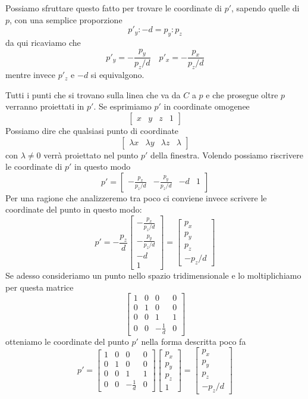 Possiamo sfruttare questo fatto per trovare le coordinate di $p'$, sapendo quelle di $p$, con una semplice proporzione
\[ p'_y : -d = p_y : p_z \]
da qui ricaviamo che
\[ p'_y = -\frac{p_y}{p_z / d} \quad p'_x = -\frac{p_x}{p_z / d} \]
mentre invece $p'_z$ e $-d$ si equivalgono.

Tutti i punti che si trovano sulla linea che va da $C$ a $p$ e che prosegue oltre $p$ verranno proiettati in $p'$.
Se esprimiamo $p'$ in coordinate omogenee
\[
	\begin{bmatrix}
		x & y & z & 1
	\end{bmatrix}
\]
Possiamo dire che qualsiasi punto di coordinate
\[
	\begin{bmatrix}
		\lambda x & \lambda y & \lambda z & \lambda
	\end{bmatrix}
\]
con $\lambda \neq 0$ verr\`a proiettato nel punto $p'$ della finestra. Volendo possiamo riscrivere le coordinate di $p'$
in questo modo
\[
	p' = \begin{bmatrix}
		-\displaystyle\frac{p_x}{p_z / d} &
		-\displaystyle\frac{p_y}{p_z / d} &
		-d                                &
		1
	\end{bmatrix}
\]
Per una ragione che analizzeremo tra poco ci conviene invece scrivere le coordinate del punto in questo modo:
\[
	p' = -\frac{p_z}{d}\begin{bmatrix}
		-\displaystyle\frac{p_x}{p_z / d} \\
		-\displaystyle\frac{p_y}{p_z / d} \\
		-d                                \\
		1
	\end{bmatrix} =
	\begin{bmatrix}
		p_x \\ p_y \\ p_z \\ -p_z / d
	\end{bmatrix}
\]
Se adesso consideriamo un punto nello spazio tridimensionale e lo moltiplichiamo per questa matrice
\[
	\begin{bmatrix}
		1 & 0 & 0            & 0 \\
		0 & 1 & 0            & 0 \\
		0 & 0 & 1            & 1 \\
		0 & 0 & -\frac{1}{d} & 0
	\end{bmatrix}
\]
otteniamo le coordinate del punto $p'$ nella forma descritta poco fa
\[
	p' = \begin{bmatrix}
		1 & 0 & 0            & 0 \\
		0 & 1 & 0            & 0 \\
		0 & 0 & 1            & 1 \\
		0 & 0 & -\frac{1}{d} & 0
	\end{bmatrix}
	\begin{bmatrix}
		p_x \\ p_y \\ p_z \\ 1
	\end{bmatrix} =
	\begin{bmatrix}
		p_x \\ p_y \\ p_z \\ -p_z / d
	\end{bmatrix}
\]
